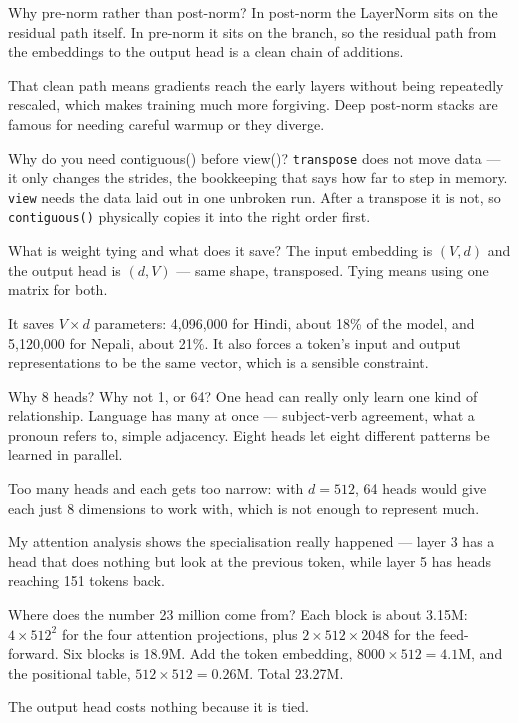 \documentclass[11pt]{report}
\newcommand{\p}[1]{\texttt{#1}}
\begin{document}
\begin{qabox}{Why pre-norm rather than post-norm?}
In post-norm the LayerNorm sits on the residual path itself. In pre-norm it sits
on the branch, so the residual path from the embeddings to the output head is a
clean chain of additions.

That clean path means gradients reach the early layers without being repeatedly
rescaled, which makes training much more forgiving. Deep post-norm stacks are
famous for needing careful warmup or they diverge.
\end{qabox}

\begin{qabox}{Why do you need contiguous() before view()?}
\p{transpose} does not move data --- it only changes the strides, the bookkeeping
that says how far to step in memory. \p{view} needs the data laid out in one
unbroken run. After a transpose it is not, so \p{contiguous()} physically copies
it into the right order first.
\end{qabox}

\begin{qabox}{What is weight tying and what does it save?}
The input embedding is $(V, d)$ and the output head is $(d, V)$ --- same shape,
transposed. Tying means using one matrix for both.

It saves $V \times d$ parameters: 4,096,000 for Hindi, about 18\% of the model,
and 5,120,000 for Nepali, about 21\%. It also forces a token's input and output
representations to be the same vector, which is a sensible constraint.
\end{qabox}

\begin{qabox}{Why 8 heads? Why not 1, or 64?}
One head can really only learn one kind of relationship. Language has many at
once --- subject-verb agreement, what a pronoun refers to, simple adjacency. Eight
heads let eight different patterns be learned in parallel.

Too many heads and each gets too narrow: with $d = 512$, 64 heads would give each
just 8 dimensions to work with, which is not enough to represent much.

My attention analysis shows the specialisation really happened --- layer 3 has a
head that does nothing but look at the previous token, while layer 5 has heads
reaching 151 tokens back.
\end{qabox}

\begin{qabox}{Where does the number 23 million come from?}
Each block is about 3.15M: $4 \times 512^2$ for the four attention projections,
plus $2 \times 512 \times 2048$ for the feed-forward. Six blocks is 18.9M. Add the
token embedding, $8000 \times 512 = 4.1$M, and the positional table,
$512 \times 512 = 0.26$M. Total 23.27M.

The output head costs nothing because it is tied.
\end{qabox}
\end{document}
